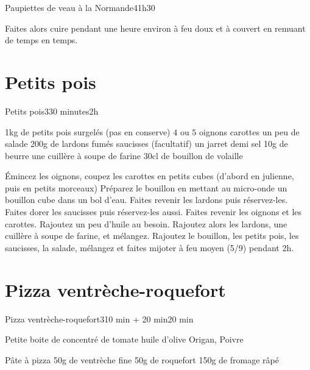 {\begin{recette}{Paupiettes de veau à la Normande}{4}{1h30}{}
\begin{cuisson}
Faites alors cuire pendant une heure environ à feu doux et à couvert en remuant de temps en temps.
\end{cuisson}


\end{recette}

\section{Petits pois}
\begin{recette}{Petits pois}{3}{30 minutes}{2h}
\begin{ingredients}
\ingredient 1kg de petits pois surgelés (pas en conserve)
\ingredient $4$ ou $5$ oignons
 carottes
\ingredient un peu de salade
\ingredient 200g de lardons fumés
 saucisses
\ingredient (facultatif) un jarret demi sel
\ingredient 10g de beurre
\ingredient une cuillère à soupe de farine
\ingredient 30cl de bouillon de volaille
\end{ingredients}

\begin{preparation}
\etape Émincez les oignons, coupez les carottes en petits cubes (d'abord en julienne, puis en petits morceaux)
\etape Préparez le bouillon en mettant au micro-onde un bouillon cube dans un bol d'eau.
\etape Faites revenir les lardons puis réservez-les. Faites dorer les saucisses puis réservez-les aussi.
\etape Faites revenir les oignons et les carottes. Rajoutez un peu d'huile au besoin.
\etape Rajoutez alors les lardons, une cuillère à soupe de farine, et mélangez.
\etape Rajoutez le bouillon, les petits pois, les saucisses, la salade, mélangez et faites mijoter à feu moyen (5/9) pendant 2h.
\end{preparation}

\end{recette}


\section{Pizza ventrèche-roquefort}
\begin{recette}{Pizza ventrèche-roquefort}{3}{10 min + 20 min}{20 min}
\begin{ingredients}
\ingredient Petite boite de concentré de tomate
\ingredient huile d'olive
\ingredient Origan, Poivre

\ingredient Pâte à pizza
\ingredient 50g de ventrèche fine
\ingredient 50g de roquefort
\ingredient 150g de fromage râpé
\end{ingredients}


\end{recette}}
